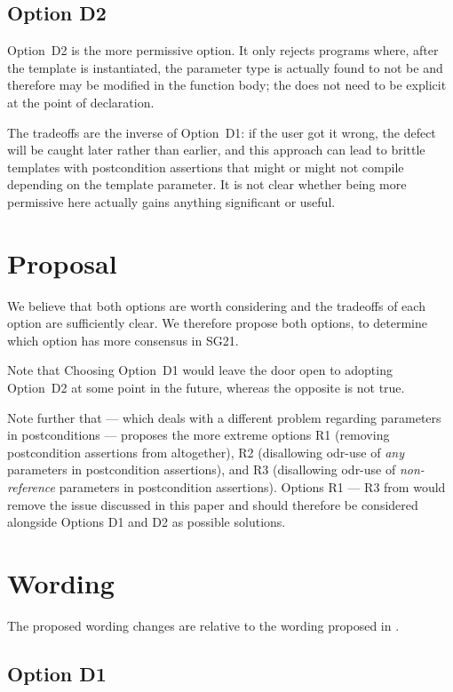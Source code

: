 \subsection*{Option D2}

Option~D2 is the more permissive option. It only rejects programs where, after the template is instantiated, the parameter type is actually found to not be  and therefore may be modified in the function body; the  does not need to be explicit at the point of declaration. 

The tradeoffs are the inverse of Option~D1: if the user got it wrong, the defect will be caught later rather than earlier, and this approach can lead to brittle templates with postcondition assertions that might or might not compile depending on the template parameter. It is not clear whether being more permissive here actually gains anything significant or useful.
\section{Proposal}

We believe that both options are worth considering and the tradeoffs of each option are sufficiently clear. We therefore propose both options, to determine which option has more consensus in SG21. 

Note that Choosing Option~D1 would leave the door open to adopting Option~D2 at some point in the future, whereas the opposite is not true.

Note further that \cite{D3487R0} --- which deals with a different problem regarding parameters in postconditions --- proposes the more extreme options R1 (removing postcondition assertions from \cite{P2900R10} altogether), R2 (disallowing odr-use of \emph{any} parameters in postcondition assertions), and R3 (disallowing odr-use of \emph{non-reference} parameters in postcondition assertions). Options R1 --- R3 from \cite{D3487R0} would remove the issue discussed in this paper and should therefore be considered alongside Options D1 and D2 as possible solutions.

\section{Wording}

The proposed wording changes are relative to the wording proposed in \cite{P2900R10}.

\subsection{Option D1}

